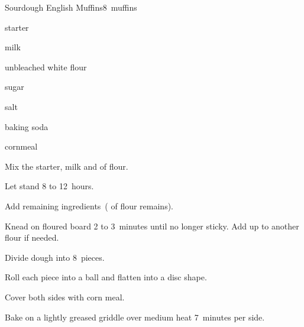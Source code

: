 \begin{recipe}{Sourdough English Muffins}{}{8~muffins}

\begin{ingredients}
\item {} starter
\item {} milk
\item {} unbleached white flour
\item {} sugar
\item \tp{\threequarter} salt
\item \tp{\half} baking soda
\item cornmeal
\end{ingredients}

\begin{directions}
\item Mix the starter, milk and  of flour.
\item Let stand 8 to 12~hours.
\item Add remaining ingredients~( of flour remains).
\item Knead on floured board 2 to 3~minutes until no longer sticky. Add up to another \C{\quarter} flour if needed.
\item Divide dough into 8~pieces.
\item Roll each piece into a ball and flatten into a disc shape.
\item Cover both sides with corn meal.
\item Bake on a lightly greased griddle over medium heat 7~minutes per side.
\end{directions}

\end{recipe}
